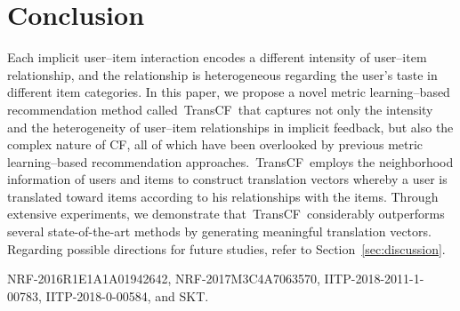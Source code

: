 \documentclass[conference]{IEEEtran}
\newcommand{\propose}{\textsf{{TransCF}}}
\begin{document}
\section{Conclusion}
Each implicit user--item interaction encodes a different intensity of user--item relationship, and the relationship is heterogeneous regarding the user's taste in different item categories.
In this paper, we propose a novel metric learning--based recommendation method called~\propose~that captures not only the intensity and the heterogeneity of user--item relationships in implicit feedback, but also the complex nature of CF, all of which have been overlooked by previous metric learning--based recommendation approaches.~\propose~employs the neighborhood information of users and items to construct translation vectors whereby a user is translated toward items according to his relationships with the items.
Through extensive experiments, we demonstrate that~\propose~considerably outperforms several state-of-the-art methods by generating meaningful translation vectors. 
Regarding possible directions for future studies, refer to Section~\ref{sec:discussion}.

NRF-2016R1E1A1A01942642, NRF-2017M3C4A7063570, IITP-2018-2011-1-00783, IITP-2018-0-00584, and SKT.

\vspace{-3ex}
{	
	
}
\end{document}
